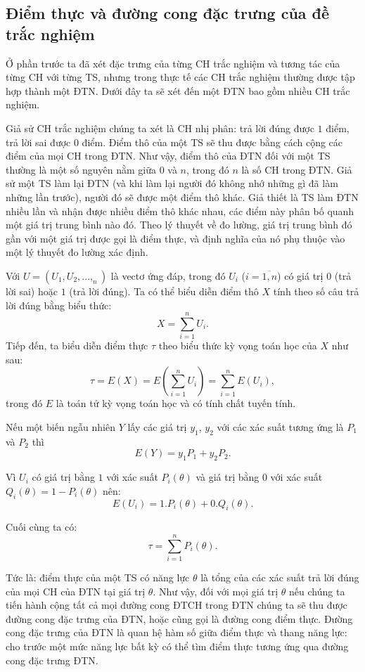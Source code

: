 \subsection{Điểm thực và đường cong đặc trưng của đề trắc nghiệm}
Ở phần trước ta đã xét đặc trưng của từng CH trắc nghiệm và tương tác của từng CH với từng TS, nhưng trong thực tế các CH trắc nghiệm thường được tập hợp thành một ĐTN. Dưới đây ta sẽ xét đến một ĐTN bao gồm nhiều CH trắc nghiệm.\par
Giả sử CH trắc nghiệm chúng ta xét là CH nhị phân: trả lời đúng được $1$ điểm, trả lời sai được $0$ điểm. Điểm thô của một TS sẽ thu được bằng cách cộng các điểm của mọi CH trong ĐTN. Như vậy, điểm thô của ĐTN đối với một TS thường là một số nguyên nằm giữa $0$ và $n$, trong đó $n$ là số CH trong ĐTN. Giả sử một TS làm lại ĐTN (và khi làm lại người đó không nhớ những gì đã làm những lần trước), người đó sẽ được một điểm thô khác. Giả thiết là TS làm ĐTN nhiều lần và nhận được nhiều điểm thô khác nhau, các điểm này phân bố quanh một giá trị trung bình nào đó. Theo lý thuyết về đo lường, giá trị trung bình đó gần với một giá trị được gọi là điểm thực, và định nghĩa của nó phụ thuộc vào một lý thuyết đo lường xác định.\par
Với $U=\left(U_1,U_2,...,_n\right)$ là vectơ ứng đáp, trong đó $U_i$ ($i=\overline{1,n}$) có giá trị $0$ (trả lời sai) hoặc $1$ (trả lời đúng). Ta có thể biểu diễn điểm thô $X$ tính theo số câu trả lời đúng bằng biểu thức: $$X=\sum_{i=1}^{n}U_i.$$
Tiếp đến, ta biểu diễn điểm thực $\tau$ theo biểu thức kỳ vọng toán học của $X$ như sau: $$\tau=E(X)=E\left(\sum_{i=1}^{n}U_i\right)=\sum_{i=1}^{n}E\left(U_i\right),$$ trong đó $E$ là toán tử kỳ vọng toán học và có tính chất tuyến tính.\par
Nếu một biến ngẫu nhiên $Y$ lấy các giá trị $y_1$, $y_2$ với các xác suất tương ứng là $P_1$ và $P_2$ thì $$E(Y)=y_1P_1+y_2P_2.$$\par
Vì $U_i$ có giá trị bằng $1$ với xác suất $P_i(\theta)$ và giá trị bằng $0$ với xác suất $Q_i(\theta)=1-P_i(\theta)$ nên:
$$E\left(U_i\right)=1.P_i(\theta)+0.Q_i(\theta).$$\par
Cuối cùng ta có: $$\tau=\sum_{i=1}^{n}P_i(\theta).$$\par
Tức là: điểm thực của một TS có năng lực $\theta$ là tổng của các xác suất trả lời đúng của mọi CH của ĐTN tại giá trị $\theta$. Như vậy, đối với mọi giá trị $\theta$ nếu chúng ta tiến hành cộng tất cả mọi đường cong ĐTCH trong ĐTN chúng ta sẽ thu được đường cong đặc trưng của ĐTN, hoặc cũng gọi là đường cong điểm thực. Đường cong đặc trưng của ĐTN là quan hệ hàm số giữa điểm thực và thang năng lực: cho trước một mức năng lực bất kỳ có thể tìm điểm thực tương ứng qua đường cong đặc trưng ĐTN.\par
